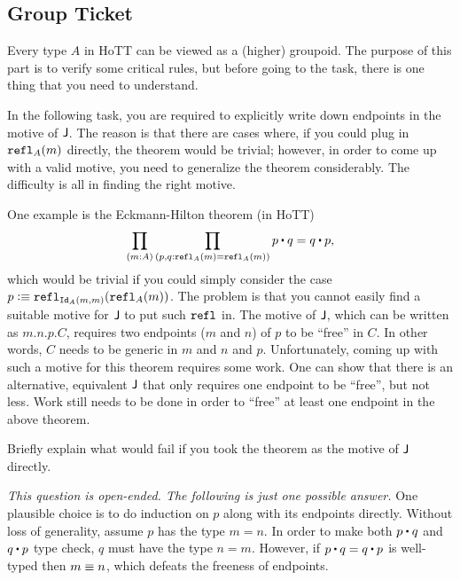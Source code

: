 \documentclass[12pt]{article}
\newcommand{\cut}[1]{}
\newcommand{\marksolution}[1]{\color{FireBrick}#1\normalcolor}%
\newcommand{\marksolution}[1]{\cut{#1}}%
\newenvironment{solution}{\trivlist \item[\hskip \labelsep{\bf
Solution:}]}{\endtrivlist}
\begin{document}
\subsection{Group Ticket}

Every type $A$ in HoTT can be viewed as a (higher) groupoid.
The purpose of this part is to verify some critical rules,
but before going to the task,
there is one thing that you need to understand.

In the following task, you are required to explicitly
write down endpoints in the motive of $\mathsf{J}$.
The reason is that there are cases where, if you could plug in $\mathtt{refl}_A(m)$ directly,
the theorem would be trivial;
however, in order to come up with a valid motive,
you need to generalize the theorem considerably.
The difficulty is all in finding the right motive.

One example is the Eckmann-Hilton theorem (in HoTT)
\[
  \prod_{(m{:}A)}\prod_{(p,q{:}\refl_A(m)=\refl_A(m))}p\concat q = q\concat p,
\]
which would be trivial if you could simply consider the case $p \vcentcolon\equiv \mathtt{refl}_{\mathtt{Id}_A(m,m)}(\mathtt{refl}_A(m))$.
The problem is that you cannot easily find a suitable motive
for $\mathsf{J}$ to put such $\mathtt{refl}$ in.
The motive of $\mathsf{J}$, which can be written as $m.n.p.C$,
requires two endpoints ($m$ and $n$) of $p$ to be ``free'' in $C$.
In other words, $C$ needs to be generic in $m$ and $n$ and $p$.
Unfortunately, coming up with such a motive for this theorem requires some work.
One can show that there is an alternative, equivalent $\mathsf{J}$
that only requires one endpoint to be ``free'', but not less.
Work still needs to be done in order to ``free'' at least one endpoint
in the above theorem.
\begin{bonus}
Briefly explain what would fail if you took the theorem as the motive of $\mathsf{J}$ directly.
\end{bonus}
\marksolution{
\begin{solution}
  \textit{This question is open-ended. The following is just one possible answer.}
  One plausible choice is to do induction on $p$ along with its endpoints directly.
  Without loss of generality, assume $p$ has the type $m = n$.
  In order to make both $p \concat q$ and $q \concat p$ type check,
  $q$ must have the type $n = m$.
  However, if $p \concat q = q \concat p$ is well-typed then $m \equiv n$,
  which defeats the freeness of endpoints.
\end{solution}
}

\end{document}
